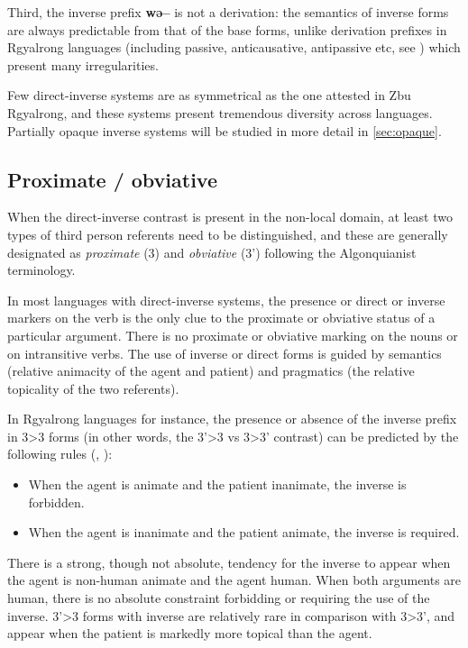 \documentclass[twoside,a4paper,11pt]{article}
\newcommand{\ipa}[1]{{\phon\textbf{#1}}}
\begin{document}
Third, the inverse prefix \ipa{wə--} is not a derivation:  the semantics of inverse forms are always predictable from that of the base forms, unlike  derivation prefixes in Rgyalrong languages (including passive, anticausative, antipassive etc, see \citealt{jacques12demotion}) which present many irregularities.


Few direct-inverse systems are as symmetrical as the one attested in Zbu Rgyalrong, and these systems present tremendous diversity across languages. Partially opaque inverse systems will be studied in more detail in \ref{sec:opaque}.

\subsection{Proximate / obviative} \label{subsec:obv}
When the direct-inverse contrast is present in the non-local domain, at least two types of third person referents need to be distinguished, and these are generally designated as \textit{proximate} (3) and \textit{obviative} (3') following the Algonquianist terminology.

In most languages with direct-inverse systems, the presence or direct or inverse markers on the verb is the only clue to the proximate or obviative status of a particular argument. There is no proximate or obviative marking on the nouns or on intransitive verbs. The use of inverse or direct forms is guided by semantics (relative animacity of the agent and patient) and pragmatics (the relative topicality of the two referents).

In Rgyalrong languages for instance, the presence or absence of the inverse prefix in 3>3 forms (in other words, the 3'>3 vs 3>3' contrast) can be predicted by the following rules (\citealt{jackson02rentongdengdi}, \citealt{jacques10inverse}):

\begin{itemize}
\item When the agent is animate and the patient inanimate, the inverse is forbidden.
\item When the agent is inanimate and the patient animate, the inverse is required.
\end{itemize}
There is a strong, though not absolute, tendency for the inverse to appear when the agent is non-human animate and the agent human. When both arguments are human, there is no absolute constraint forbidding or requiring the use of the inverse. 3'>3 forms with inverse are relatively rare in comparison with 3>3', and appear when the patient is markedly more topical than the agent.
\end{document}
